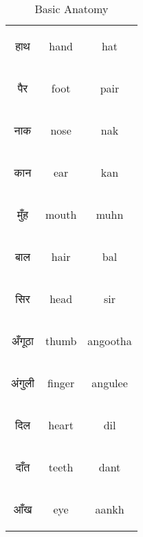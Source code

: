 \begin{table}[H]
    \centering
    \begin{tabular}{c|c|c}
\begin{hindi} हाथ \end{hindi} & hand & hat \\ 
\begin{hindi} पैर \end{hindi} & foot & pair \\ 
\begin{hindi} नाक \end{hindi} & nose & nak \\ 
\begin{hindi} कान \end{hindi} & ear & kan \\ 
\begin{hindi} मुँह \end{hindi} & mouth & muhn \\ 
\begin{hindi} बाल \end{hindi} & hair & bal \\ 
\begin{hindi} सिर \end{hindi} & head & sir \\ 
\begin{hindi} अँगूठा \end{hindi} & thumb & angootha \\ 
\begin{hindi} अंगुली \end{hindi} & finger & angulee \\ 
\begin{hindi} दिल \end{hindi} & heart & dil \\ 
\begin{hindi} दाँत \end{hindi} & teeth & dant \\ 
\begin{hindi} आँख \end{hindi} & eye & aankh \\  
    \end{tabular}
    \caption{Basic Anatomy}
    \label{tab:nouns_anatomy}
\end{table}


